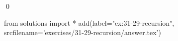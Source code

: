 
\begin{ex}
  \label{ex:31-29-recursion}
  
  \qed
\end{ex}
\begin{python0}
from solutions import *
add(label="ex:31-29-recursion",
    srcfilename='exercises/31-29-recursion/answer.tex')
\end{python0}
